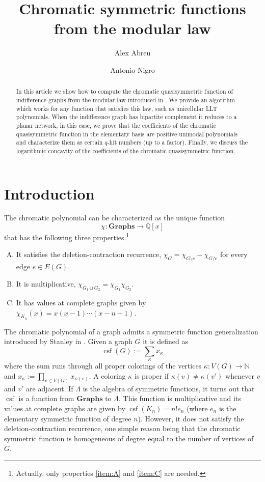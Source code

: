 \documentclass[10pt]{amsart}
\title[Chromatic symmetric functions from the modular law]{Chromatic symmetric functions from the modular law}
\author{Alex Abreu}
\author{Antonio Nigro}
\theoremstyle{definition}
\newcommand{\col}{\colon}
\DeclareMathOperator{\csf}{csf}
\newcommand{\sym}{\Lambda}
\begin{document}
\maketitle

\begin{abstract}
  In this article we show how to compute the chromatic quasisymmetric function of indifference graphs from the modular law introduced in \cite{GPmodular}. We provide an algorithm which works for any function that satisfies this law, such as unicellular LLT polynomials. When the indifference graph has bipartite complement it reduces to a planar network, in this case, we prove that the coefficients of the chromatic quasisymmetric function in the elementary basis are positive unimodal polynomials and characterize them as certain $q$-hit numbers (up to a factor). Finally, we discuss the logarithmic concavity of the coefficients of the chromatic quasisymmetric function.
\end{abstract}

\tableofcontents

\section{Introduction}
    The chromatic polynomial can be characterized as the unique function
    \[
    \chi\col \mathbf{Graphs}\to \mathbb{Q}[x]
    \]
    that has the following three properties.\footnote{Actually, only properties \eqref{item:A} and \eqref{item:C} are needed.}
    \begin{enumerate}[(A)]
        \item\label{item:A} It satisfies the deletion-contraction recurrence, $\chi_{G}=\chi_{G\setminus e}-\chi_{G/e}$ for every edge $e\in E(G)$.
        \item\label{item:B} It is multiplicative, $\chi_{G_1\sqcup G_2}=\chi_{G_1}\chi_{G_2}$.
        \item\label{item:C} It has values at complete graphs given by $\chi_{K_n}(x)=x(x-1)\cdots(x-n+1)$.
    \end{enumerate}

     The chromatic polynomial of a graph admits a symmetric function generalization introduced by Stanley in \cite{Stan95}. Given a graph $G$ it is defined as
     \[
     \csf(G):=\sum_{\kappa}x_{\kappa}
     \]
     where the sum runs through all proper colorings of the vertices  $\kappa\col V(G)\to \mathbb{N}$ and $x_{\kappa}:=\prod_{v\in V(G)} x_{\kappa(v)}$. A coloring $\kappa$ is proper if $\kappa(v)\neq\kappa(v')$ whenever $v$ and $v'$ are adjacent. If $\sym$ is the algebra of symmetric functions, it turns out that $\csf$ is a function from $\mathbf{Graphs}$ to $\Lambda$. This function is multiplicative and its values at complete graphs are given by $\csf(K_n)=n!e_n$ (where $e_n$ is the elementary symmetric function of degree $n$).  However, it does not satisfy the deletion-contraction recurrence, one simple reason being that the chromatic symmetric function is homogeneous of degree equal to the number of vertices of $G$.\par
\end{document}
